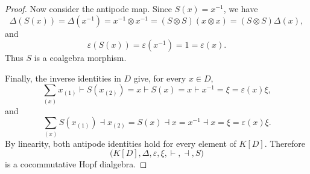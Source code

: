 \documentclass[10pt,a4paper]{amsart}
\begin{document}
\begin{proof}
		Now consider the antipode map. Since \(S(x)=x^{-1}\), we have
		\[
		\Delta(S(x))
		=
		\Delta(x^{-1})
		=
		x^{-1}\otimes x^{-1}
		=
		(S\otimes S)(x\otimes x)
		=
		(S\otimes S)\Delta(x),
		\]
		and
		\[
		\varepsilon(S(x))=\varepsilon(x^{-1})=1=\varepsilon(x).
		\]
		Thus \(S\) is a coalgebra morphism.
		
		Finally, the inverse identities in \(D\) give, for every \(x\in D\),
		\[
		\sum_{(x)}x_{(1)}\vdash S(x_{(2)})
		=
		x\vdash S(x)
		=
		x\vdash x^{-1}
		=
		\xi
		=
		\varepsilon(x)\xi,
		\]
		and
		\[
		\sum_{(x)}S(x_{(1)})\dashv x_{(2)}
		=
		S(x)\dashv x
		=
		x^{-1}\dashv x
		=
		\xi
		=
		\varepsilon(x)\xi.
		\]
		By linearity, both antipode identities hold for every element of \(K[D]\).
		Therefore
		\[
		\bigl(K[D],\Delta,\varepsilon,\xi,\vdash,\dashv,S\bigr)
		\]
		is a cocommutative Hopf dialgebra.
	\end{proof}
\end{document}
